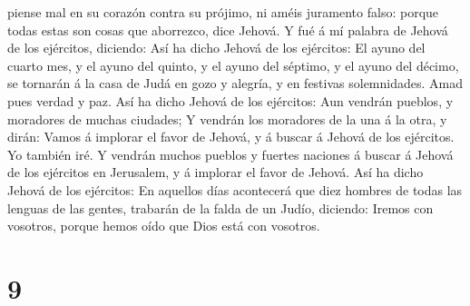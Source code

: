 piense mal en su corazón contra su prójimo, ni améis juramento falso:
porque todas estas son cosas que aborrezco, dice Jehová. 
Y fué á mí palabra de Jehová de los ejércitos, diciendo: 
Así ha dicho Jehová de los ejércitos: El ayuno del cuarto mes, y el
ayuno del quinto, y el ayuno del séptimo, y el ayuno del décimo, se
tornarán á la casa de Judá en gozo y alegría, y en festivas
solemnidades. Amad pues verdad y paz.  Así ha dicho
Jehová de los ejércitos: Aun vendrán pueblos, y moradores de muchas
ciudades;  Y vendrán los moradores de la una á la otra, y
dirán: Vamos á implorar el favor de Jehová, y á buscar á Jehová de los
ejércitos. Yo también iré.  Y vendrán muchos pueblos y
fuertes naciones á buscar á Jehová de los ejércitos en Jerusalem, y á
implorar el favor de Jehová.  Así ha dicho Jehová de los
ejércitos: En aquellos días acontecerá que diez hombres de todas las
lenguas de las gentes, trabarán de la falda de un Judío, diciendo:
Iremos con vosotros, porque hemos oído que Dios está con vosotros.

\hypertarget{section-8}{%
\section{9}\label{section-8}}

